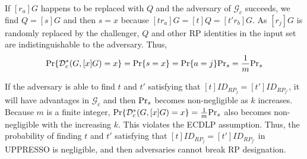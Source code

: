If $[r_a]G$ happens to be replaced with $Q$ and the adversary of $\mathcal{G}_c$ succeeds,
    we find $Q = [s]G$ and then $s=x$ because $[tr_a]G = [t]Q = [t'r_b]G$.
As $[r_j]G$ is randomly replaced by the challenger,
    $Q$ and other RP identities in the input set are indistinguishable to the adversary.
Thus,
\begin{equation*}
{\rm Pr}\{\mathcal{D}^*_c(G, [x]G)=x\} = {\rm Pr}\{s = x\}={\rm Pr}\{a=j\}{\rm Pr}_s=\frac{1}{m}{\rm Pr}_s
\end{equation*}

If the adversary is able to find $t$ and $t'$
    satisfying that $[t]ID_{RP_j} = [t']ID_{RP_{j'}}$,
    it will have advantages in $\mathcal{G}_c$
        and then
         ${\rm Pr}_s$ becomes non-negligible as $k$ increases.
Because $m$ is a finite integer, ${\rm Pr}\{\mathcal{D}^*_c(G, [x]G)=x\} = \frac{1}{m}{\rm Pr}_s$ also
becomes non-negligible with the increasing $k$.
This violates the ECDLP assumption.
Thus, the probability of finding $t$ and $t'$ satisfying that $[t]ID_{RP_j} = [t']ID_{RP_{j'}}$ in UPPRESSO is negligible,
    and then adversaries cannot break RP designation.






